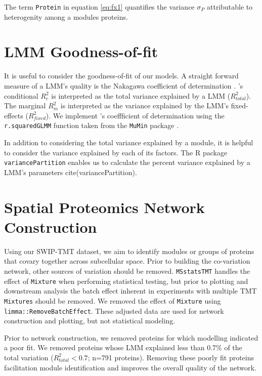\documentclass[11pt]{elife}\usepackage[]{graphicx}\usepackage[]{color}
\begin{document}
The term \texttt{Protein} in equation \ref{eq:fx1} quantifies the variance
$\sigma_P$ attributable to heterogenity among a modules proteins.


\section{LMM Goodness-of-fit}

It is useful to consider the goodness-of-fit of our models. A straight forward
measure of a LMM's quality is the Nakagawa coefficient of 
determination \citep{Nakagawa2012}. \cite{Nakagawa2012}'s conditional $R^2_c$ is 
interpreted as the total variance explained by a LMM ($R^2_{total}$).
The marginal $R^2_m$ is interpreted as the variance explained by the LMM's 
fixed-effects ($R^2_{fixed}$). We implement \cite{Nakagawa2012}'s coeffficient of 
determination using the \texttt{r.squaredGLMM} function taken from the 
\texttt{MuMin} package \citep{WangMerkle2018}. 

In addition to considering the total variance explained by a module, it is
helpful to consider the variance explained by each of its factors.
The R package \texttt{variancePartition} enables us to
calculate the percent variance explained by a LMM's parameters
cite(variancePartition). 


\section{Spatial Proteomics Network Construction}

Using our SWIP-TMT dataset, we aim to identify modules or groups of proteins
that covary together across subcellular space. Prior to building the
co-variation network, other sources of variation should be removed.
\texttt{MSstatsTMT} handles the effect of \texttt{Mixture} when performing
statistical testing,  but prior to plotting and downstream analysis the batch
effect inherent in experiments with multiple TMT \texttt{Mixtures} should be
removed.  We removed the effect of \texttt{Mixture} using
\texttt{limma::RemoveBatchEffect}. These adjusted data are used for network
construction and plotting, but not statistical modeling.

Prior to network construction, we removed proteins for which modelling indicated
a poor fit. We removed proteins whose LMM explained less than 0.7\% of the total
variation ($R^2_{total}<0.7$; n=791 proteins). Removing these poorly fit proteins facilitation
module identification and improves the overall quality of the network.
\end{document}

